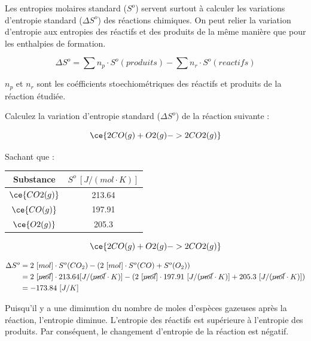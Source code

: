 \documentclass[
  11pt,
  a4paper,
  openany]{book}
\begin{document}
\clearpage

Les entropies molaires standard (\(S^{o}\)) servent surtout à calculer les variations d'entropie standard (\(\Delta S^{o}\)) des réactions chimiques. On peut relier la variation d'entropie aux entropies des réactifs et des produits de la même manière que pour les enthalpies de formation.

\[
\Delta S^o = \sum n_p \cdot S^{o}(produits) - \sum n_r \cdot S^{o}(reactifs)
\]

\(n_p\) et \(n_r\) sont les coéfficients stoechiométriques des réactifs et produits de la réaction étudiée.

\begin{Exercise}
Calculez la variation d'entropie standard (\(\Delta S^o\)) de la réaction suivante :

\[ \ce{2 CO(g) + O2(g) -> 2CO2(g)} \]

Sachant que :

\end{Exercise}

\begin{longtable}[]{@{}cc@{}}
\toprule()
Substance & \(S^o\ [J/(mol \cdot K)]\) \\
\midrule()
\endhead
\(\ce{CO2(g)}\) & 213.64 \\
\(\ce{CO(g)}\) & 197.91 \\
\(\ce{O2(g)}\) & 205.3 \\
\bottomrule()
\end{longtable}


\begin{Answer}

\[ \ce{2 CO(g) + O2(g) -> 2CO2(g)} \]

\[
\begin{split}
\Delta S^o &= 2\ [mol] \cdot S^o(CO_2) - ( 2\ [mol] \cdot S^o(CO) + S^o(O_2) ) \\
&= 2\ [\cancel{mol}] \cdot 213.64 [J/(\cancel{mol} \cdot K)] - ( 2\ [\cancel{mol}] \cdot 197.91\ [J/(\cancel{mol} \cdot K)] + 205.3\ [J/(\cancel{mol} \cdot K)] ) \\
&= -173.84\ [J/K]
\end{split}
\]

Puisqu'il y a une diminution du nombre de moles d'espèces gazeuses après la réaction, l'entropie diminue. L'entropie des réactifs est supérieure à l'entropie des produits. Par conséquent, le changement d'entropie de la réaction est négatif.

\clearpage

\end{Answer}
\end{document}

